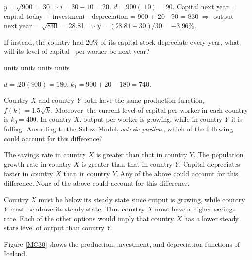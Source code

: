 \documentclass[addpoints,11pt]{exam}
\theoremstyle{definition}
\begin{document}
\begin{questions}
			\begin{solution}
				$y = \sqrt{900} = 30 \Rightarrow i = 30 - 10 = 20$. $d = 900(.10) = 90$. Capital next year = capital today + investment - depreciation = 900 + 20 - 90 = 830 $\Rightarrow$ output next year = $\sqrt{830}$ = 28.81 $\Rightarrow \hat{y} = (28.81 - 30)/30 = -3.96\%$.
			\end{solution}
			
			\question \label{blah2} If instead, the country had 20\% of its capital stock depreciate every year, what will its level of capital \ per worker be next year?
			
			\begin{choices}
				 units
				 units
				 units
				 units
			\end{choices}

	\begin{solution}
		$d = .20(900) = 180$. $k_{1} = 900 + 20 - 180 = 740$.
	\end{solution}
			
		\question Country $X$ and country $Y$ both have the same production function, $f(k)=1.5\sqrt{k}$. Moreover, the current level of capital per worker in each country is $k_0 = 400$. In country $X$, output per worker is growing, while in country $Y$ it is falling. According to the Solow Model, \textit{ceteris paribus}, which of the following could account for this difference?
		
		\begin{choices}
			\CorrectChoice The savings rate in country $X$ is greater than that in country $Y$.
			\choice The population growth rate in country $X$ is greater than that in country $Y$.
			\choice Capital depreciates faster in country $X$ than in country $Y$.
			\choice Any of the above could account for this difference.
			\choice None of the above could account for this difference.
		\end{choices}
		
		\begin{solution}
			Country $X$ must be below its steady state since output is growing, while country $Y$ must be above its steady state. Thus country $X$ must have a higher savings rate. Each of the other options would imply that country $X$ has a lower steady state level of output than country $Y$.
		\end{solution}
	
		
			\question Figure \ref{MC30} shows the production, investment, and depreciation functions of Iceland.
		

\end{questions}
\end{document}
